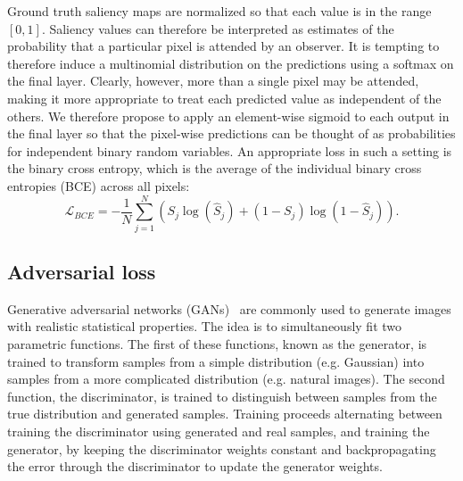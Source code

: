 \documentclass[times,twocolumn,final,authoryear]{elsarticle}
\begin{document}
Ground truth saliency maps are normalized so that each value is in the range $[0, 1]$. Saliency values can therefore be interpreted as estimates of the probability that a particular pixel is attended by an observer. It is tempting to therefore induce a multinomial distribution on the predictions using a softmax on the final layer. Clearly, however, more than a single pixel may be attended, making it more appropriate to treat each predicted value as independent of the others. We therefore propose to apply an element-wise sigmoid to each output in the final layer so that the pixel-wise predictions  can be thought of as probabilities for independent binary random variables. An appropriate loss in such a setting is the
binary cross entropy, which is the average of the individual binary cross entropies (BCE) across all pixels:
\begin{equation}
\mathcal{L}_{BCE} = 
-\frac{1}{N}
\sum_{j=1}^{N} 
(S_j \log(\hat{S}_j) + (1 - S_j)\log(1 - \hat{S}_j)).  
\end{equation}



\subsection{Adversarial loss}
\label{ssec:Adversarial}


Generative adversarial networks (GANs)~\citep{goodfellow2014generative} are commonly used to generate images with realistic statistical properties. The idea is to simultaneously fit two parametric functions. The first of these functions, known as the generator, is trained to transform samples from a simple distribution (e.g. Gaussian) into samples from a more complicated distribution (e.g. natural images). The second function, the discriminator, is trained to distinguish between samples from the true distribution and generated samples. Training proceeds alternating between training the discriminator using generated and real samples, and training the generator, by keeping the discriminator weights constant and backpropagating the error through the discriminator to update the generator weights.
\end{document}
